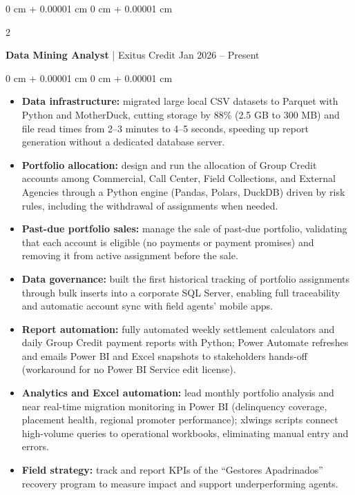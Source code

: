 \documentclass[10pt, a4paper]{article}
\newenvironment{highlights}{
    \begin{itemize}[
        topsep=0.10 cm,
        parsep=0.10 cm,
        partopsep=0pt,
        itemsep=0pt,
        leftmargin=0 cm + 10pt
    ]
}{
    \end{itemize}
} %
\newenvironment{onecolentry}{
    \begin{adjustwidth}{
        0 cm + 0.00001 cm
    }{
        0 cm + 0.00001 cm
    }
}{
    \end{adjustwidth}
} %
\newenvironment{twocolentry}[2][]{
    \onecolentry
    \def\secondColumn{#2}
    \setcolumnwidth{\fill, 4.5 cm}
    \begin{paracol}{2}
}{
    \switchcolumn \raggedleft \secondColumn
    \end{paracol}
    \endonecolentry
} %
\begin{document}
    \begin{twocolentry}{
            Jan 2026 -- Present
        }
        \textbf{Data Mining Analyst} | Exitus Credit\end{twocolentry}

        \vspace{0.10 cm}
        \begin{onecolentry}
            \begin{highlights}
                \item \textbf{Data infrastructure:} migrated large local CSV datasets to Parquet with Python and MotherDuck, cutting storage by 88\% (2.5 GB to 300 MB) and file read times from 2--3 minutes to 4--5 seconds, speeding up report generation without a dedicated database server.
                \item \textbf{Portfolio allocation:} design and run the allocation of Group Credit accounts among Commercial, Call Center, Field Collections, and External Agencies through a Python engine (Pandas, Polars, DuckDB) driven by risk rules, including the withdrawal of assignments when needed.
                \item \textbf{Past-due portfolio sales:} manage the sale of past-due portfolio, validating that each account is eligible (no payments or payment promises) and removing it from active assignment before the sale.
                \item \textbf{Data governance:} built the first historical tracking of portfolio assignments through bulk inserts into a corporate SQL Server, enabling full traceability and automatic account sync with field agents' mobile apps.
                \item \textbf{Report automation:} fully automated weekly settlement calculators and daily Group Credit payment reports with Python; Power Automate refreshes and emails Power BI and Excel snapshots to stakeholders hands-off (workaround for no Power BI Service edit license).
                \item \textbf{Analytics and Excel automation:} lead monthly portfolio analysis and near real-time migration monitoring in Power BI (delinquency coverage, placement health, regional promoter performance); xlwings scripts connect high-volume queries to operational workbooks, eliminating manual entry and errors.
                \item \textbf{Field strategy:} track and report KPIs of the ``Gestores Apadrinados'' recovery program to measure impact and support underperforming agents.
            \end{highlights}
        \end{onecolentry}
\end{document}
